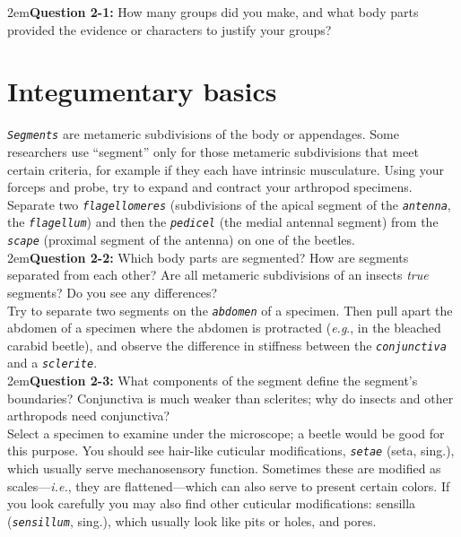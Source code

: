 \documentclass[letterpaper, 11pt]{article}
\newcommand{\latinword}[1]{\texttt{\itshape #1}}%
\begin{document}
\hangindent2em{}\textbf{Question 2-1:} How many groups did you make, and what body parts provided the evidence or characters to justify your groups?

\section{Integumentary basics}
\latinword{Segments} are metameric subdivisions of the body or appendages. Some researchers use ``segment'' only for those metameric subdivisions that meet certain criteria, for example if they each have intrinsic musculature. Using your forceps and probe, try to expand and contract your arthropod specimens. Separate two \latinword{flagellomeres} (subdivisions of the apical segment of the \latinword{antenna}, the \latinword{flagellum}) and then the \latinword{pedicel} (the medial antennal segment) from the \latinword{scape} (proximal segment of the antenna) on one of the beetles.\\

\hangindent2em\textbf{Question 2-2:} Which body parts are segmented? How are segments separated from each other? Are all metameric subdivisions of an insects \textit{true} segments? Do you see any differences?\\

\noindent{}Try to separate two segments on the \latinword{abdomen} of a specimen. Then pull apart the abdomen of a specimen where the abdomen is protracted (\textit{e.g}., in the bleached carabid beetle), and observe the difference in stiffness between the \latinword{conjunctiva} and a \latinword{sclerite}. \\

\hangindent2em\textbf{Question 2-3:} What components of the segment define the segment's boundaries? Conjunctiva is much weaker than sclerites; why do insects and other arthropods need conjunctiva?\\

\noindent{}Select a specimen to examine under the microscope; a beetle would be good for this purpose. You should see hair-like cuticular modifications, \latinword{setae} (seta, sing.), which usually serve mechanosensory function. Sometimes these are modified as scales---\textit{i.e.}, they are flattened---which can also serve to present certain colors. If you look carefully you may also find other cuticular modifications: sensilla (\latinword{sensillum}, sing.), which usually look like pits or holes, and pores.\\
\end{document}
